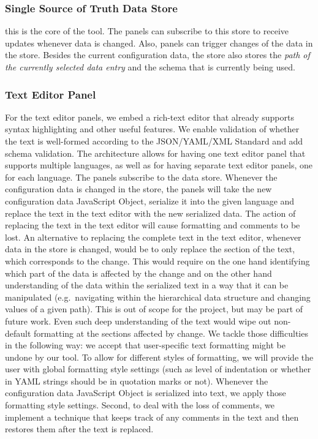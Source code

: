 
\subsubsection{Single Source of Truth Data Store}
this is the core of the tool.
The panels can subscribe to this store to receive updates whenever data is changed.
Also, panels can trigger changes of the data in the store.
Besides the current configuration data, the store also stores the \textit{path of the currently selected data entry} and the schema that is currently being used.


\subsubsection{Text Editor Panel}\label{subsubsec:design_text_editor_panel} %
For the text editor panels, we embed a rich-text editor that already supports syntax highlighting and other useful features.
We enable validation of whether the text is well-formed according to the JSON/YAML/XML Standard and add schema validation.
The architecture allows for having one text editor panel that supports multiple languages, as well as for having separate text editor panels, one for each language.
The panels subscribe to the data store.
Whenever the configuration data is changed in the store, the panels will take the new configuration data JavaScript Object, serialize it into the given language and replace the text in the text editor with the new serialized data.
The action of replacing the text in the text editor will cause formatting and comments to be lost.
An alternative to replacing the complete text in the text editor, whenever data in the store is changed, would be to only replace the section of the text, which corresponds to the change.
This would require on the one hand identifying which part of the data is affected by the change and on the other hand understanding of the data within the serialized text in a way that it can be manipulated (e.g.\ navigating within the hierarchical data structure and changing values of a given path).
This is out of scope for the project, but may be part of future work.
Even such deep understanding of the text would wipe out non-default formatting at the sections affected by change.
We tackle those difficulties in the following way: we accept that user-specific text formatting might be undone by our tool.
To allow for different styles of formatting, we will provide the user with global formatting style settings (such as level of indentation or whether in YAML strings should be in quotation marks or not). %
Whenever the configuration data JavaScript Object is serialized into text, we apply those formatting style settings.
Second, to deal with the loss of comments, we implement a technique that keeps track of any comments in the text and then restores them after the text is replaced. %


